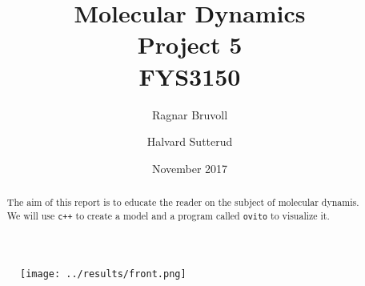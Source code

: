 \documentclass[10pt]{article}
\begin{document}
\title{Molecular Dynamics
\\ Project 5
\\ FYS3150}
\author{Ragnar Bruvoll \and Halvard Sutterud}
\date{November 2017}
\maketitle{\begin{center}\end{center}}
\thispagestyle{empty}

\begin{figure}[htpb]
    \centering
    \texttt{[image: ../results/front.png]}
    \label{fig:name}
\end{figure}

\begin{abstract}
    The aim of this report is to educate the reader on the subject of molecular dynamis. We will use \texttt{c++} to create a model and a program called \texttt{ovito} to visualize it.
\end{abstract}

\newpage
\end{document}
